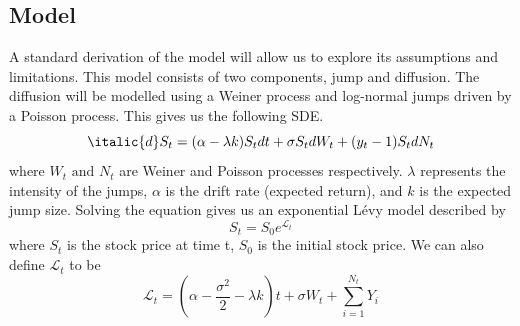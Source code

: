 \documentclass[12pt]{article}
\numberwithin{equation}{section}
\begin{document}
\subsection{Model}
A standard derivation of the model will allow us to explore its assumptions and 
limitations. This model consists of two components, jump and diffusion. The 
diffusion will be modelled using a Weiner process and log-normal jumps driven 
by a Poisson process. This gives us the following
SDE. 
\begin{equation}
  \italic{d}S_t = (\alpha - \lambda k)S_tdt + \sigma S_t dW_t + (y_t-1)S_tdN_t
\end{equation}
where $W_t \text{ and } N_t$ are Weiner and Poisson processes respectively. 
$\lambda$ represents the intensity of the jumps, $\alpha$ is the drift rate
(expected return), and $k$ is the expected jump size. 
Solving the equation gives us an exponential L\'{e}vy model described by 
\begin{equation}
  S_t = S_0e^{\mathcal{L}_t}
\end{equation}
where $S_t$ is the stock price at time t, $S_0$ is the initial stock price. 
We can also define $\mathcal{L}_t$ to be 
\begin{equation}
  \mathcal{L}_t = (\alpha - \frac{\sigma^2}{2}-\lambda k)t + \sigma W_t + 
  \sum^{N_t}_{i=1}Y_i
\end{equation}
\end{document}

